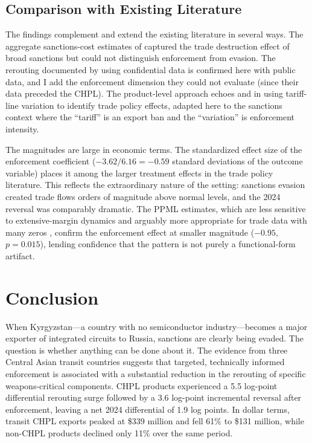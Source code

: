 \documentclass[12pt]{article}
\begin{document}
\subsection{Comparison with Existing Literature}

The findings complement and extend the existing literature in several ways. The aggregate sanctions-cost estimates of \citet{crozet2020friendly} captured the trade destruction effect of broad sanctions but could not distinguish enforcement from evasion. The rerouting documented by \citet{egorov2024sanctions} using confidential data is confirmed here with public data, and I add the enforcement dimension they could not evaluate (since their data preceded the CHPL). The product-level approach echoes \citet{fajgelbaum2020return} and \citet{amiti2019impact} in using tariff-line variation to identify trade policy effects, adapted here to the sanctions context where the ``tariff'' is an export ban and the ``variation'' is enforcement intensity.

The magnitudes are large in economic terms. The standardized effect size of the enforcement coefficient ($-3.62 / 6.16 = -0.59$ standard deviations of the outcome variable) places it among the larger treatment effects in the trade policy literature. This reflects the extraordinary nature of the setting: sanctions evasion created trade flows orders of magnitude above normal levels, and the 2024 reversal was comparably dramatic. The PPML estimates, which are less sensitive to extensive-margin dynamics and arguably more appropriate for trade data with many zeros \citep{silva2006log}, confirm the enforcement effect at smaller magnitude ($-0.95$, $p = 0.015$), lending confidence that the pattern is not purely a functional-form artifact.


\section{Conclusion}
\label{sec:conclusion}

When Kyrgyzstan---a country with no semiconductor industry---becomes a major exporter of integrated circuits to Russia, sanctions are clearly being evaded. The question is whether anything can be done about it. The evidence from three Central Asian transit countries suggests that targeted, technically informed enforcement is associated with a substantial reduction in the rerouting of specific weapons-critical components. CHPL products experienced a 5.5 log-point differential rerouting surge followed by a 3.6 log-point incremental reversal after enforcement, leaving a net 2024 differential of 1.9 log points. In dollar terms, transit CHPL exports peaked at \$339 million and fell 61\% to \$131 million, while non-CHPL products declined only 11\% over the same period.
\end{document}
